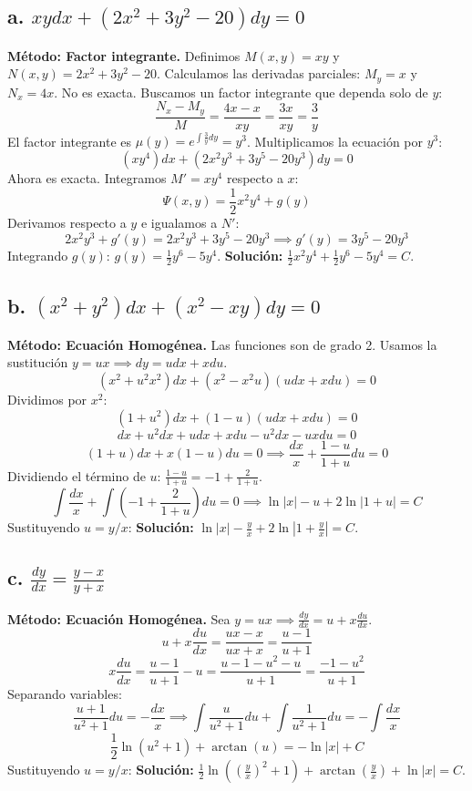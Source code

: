 \documentclass[a4paper]{article}
\begin{document}
\subsection*{a. $xy dx + (2x^2 + 3y^2 - 20) dy = 0$}
\textbf{Método: Factor integrante.}
Definimos $M(x,y) = xy$ y $N(x,y) = 2x^2 + 3y^2 - 20$.
Calculamos las derivadas parciales: $M_y = x$ y $N_x = 4x$. No es exacta.
Buscamos un factor integrante que dependa solo de $y$:
$$\frac{N_x - M_y}{M} = \frac{4x - x}{xy} = \frac{3x}{xy} = \frac{3}{y}$$
El factor integrante es $\mu(y) = e^{\int \frac{3}{y} dy} = y^3$.
Multiplicamos la ecuación por $y^3$:
$$(xy^4) dx + (2x^2y^3 + 3y^5 - 20y^3) dy = 0$$
Ahora es exacta. Integramos $M' = xy^4$ respecto a $x$:
$$\Psi(x,y) = \frac{1}{2}x^2y^4 + g(y)$$
Derivamos respecto a $y$ e igualamos a $N'$:
$$2x^2y^3 + g'(y) = 2x^2y^3 + 3y^5 - 20y^3 \implies g'(y) = 3y^5 - 20y^3$$
Integrando $g(y)$: $g(y) = \frac{1}{2}y^6 - 5y^4$.
\textbf{Solución:} $\frac{1}{2}x^2y^4 + \frac{1}{2}y^6 - 5y^4 = C$.

\subsection*{b. $(x^2 + y^2) dx + (x^2 - xy) dy = 0$}
\textbf{Método: Ecuación Homogénea.}
Las funciones son de grado 2. Usamos la sustitución $y = ux \implies dy = u dx + x du$.
$$(x^2 + u^2x^2) dx + (x^2 - x^2u)(u dx + x du) = 0$$
Dividimos por $x^2$:
$$(1 + u^2) dx + (1 - u)(u dx + x du) = 0$$
$$dx + u^2 dx + u dx + x du - u^2 dx - ux du = 0$$
$$(1 + u) dx + x(1 - u) du = 0 \implies \frac{dx}{x} + \frac{1 - u}{1 + u} du = 0$$
Dividiendo el término de $u$: $\frac{1-u}{1+u} = -1 + \frac{2}{1+u}$.
$$\int \frac{dx}{x} + \int \left( -1 + \frac{2}{1+u} \right) du = 0 \implies \ln|x| - u + 2\ln|1+u| = C$$
Sustituyendo $u = y/x$:
\textbf{Solución:} $\ln|x| - \frac{y}{x} + 2\ln|1 + \frac{y}{x}| = C$.

\subsection*{c. $\frac{dy}{dx} = \frac{y-x}{y+x}$}
\textbf{Método: Ecuación Homogénea.}
Sea $y = ux \implies \frac{dy}{dx} = u + x \frac{du}{dx}$.
$$u + x \frac{du}{dx} = \frac{ux - x}{ux + x} = \frac{u-1}{u+1}$$
$$x \frac{du}{dx} = \frac{u-1}{u+1} - u = \frac{u-1 - u^2 - u}{u+1} = \frac{-1 - u^2}{u+1}$$
Separando variables:
$$\frac{u+1}{u^2+1} du = -\frac{dx}{x} \implies \int \frac{u}{u^2+1} du + \int \frac{1}{u^2+1} du = -\int \frac{dx}{x}$$
$$\frac{1}{2}\ln(u^2+1) + \arctan(u) = -\ln|x| + C$$
Sustituyendo $u = y/x$:
\textbf{Solución:} $\frac{1}{2}\ln\left(\left(\frac{y}{x}\right)^2 + 1\right) + \arctan\left(\frac{y}{x}\right) + \ln|x| = C$.
\end{document}
